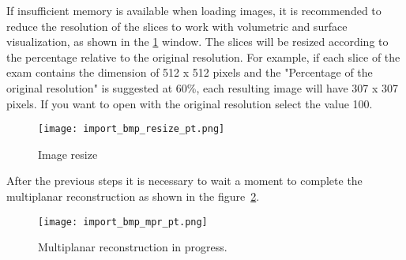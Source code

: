 If insufficient memory is available when loading images, it is recommended to reduce the resolution of the slices to work with volumetric and surface visualization, as shown in the \ref{fig:import_bmp_resize_pt} window. The slices will be resized according to the percentage relative to the original resolution. For example, if each slice of the exam contains the dimension of 512 x 512 pixels and the "Percentage of the original resolution" is suggested at 60\%, each resulting image will have 307 x 307 pixels. If you want to open with the original resolution select the value 100.


\begin{figure}[!htb]
\centering
\texttt{[image: import\_bmp\_resize\_pt.png]}
\caption{Image resize}
\label{fig:import_bmp_resize_pt}
\end{figure}


After the previous steps it is necessary to wait a moment to complete the multiplanar reconstruction as shown in the figure~\ref{fig:import_bmp_mpr_pt.png}.

\begin{figure}[!htb]
\centering
\texttt{[image: import\_bmp\_mpr\_pt.png]}
\caption{Multiplanar reconstruction in progress.}
\label{fig:import_bmp_mpr_pt.png}
\end{figure}
